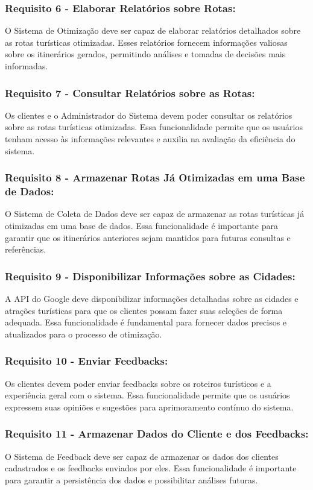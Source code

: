 \subsubsection{Requisito 6 - Elaborar Relatórios sobre Rotas:} O Sistema de Otimização deve ser capaz de elaborar relatórios detalhados sobre as rotas turísticas otimizadas. Esses relatórios fornecem informações valiosas sobre os itinerários gerados, permitindo análises e tomadas de decisões mais informadas.

\subsubsection{Requisito 7 - Consultar Relatórios sobre as Rotas:} Os clientes e o Administrador do Sistema devem poder consultar os relatórios sobre as rotas turísticas otimizadas. Essa funcionalidade permite que os usuários tenham acesso às informações relevantes e auxilia na avaliação da eficiência do sistema.

\subsubsection{Requisito 8 - Armazenar Rotas Já Otimizadas em uma Base de Dados:} O Sistema de Coleta de Dados deve ser capaz de armazenar as rotas turísticas já otimizadas em uma base de dados. Essa funcionalidade é importante para garantir que os itinerários anteriores sejam mantidos para futuras consultas e referências.

\subsubsection{Requisito 9 - Disponibilizar Informações sobre as Cidades:} A API do Google deve disponibilizar informações detalhadas sobre as cidades e atrações turísticas para que os clientes possam fazer suas seleções de forma adequada. Essa funcionalidade é fundamental para fornecer dados precisos e atualizados para o processo de otimização.

\subsubsection{Requisito 10 - Enviar Feedbacks:} Os clientes devem poder enviar feedbacks sobre os roteiros turísticos e a experiência geral com o sistema. Essa funcionalidade permite que os usuários expressem suas opiniões e sugestões para aprimoramento contínuo do sistema.

\subsubsection{Requisito 11 - Armazenar Dados do Cliente e dos Feedbacks:} O Sistema de Feedback deve ser capaz de armazenar os dados dos clientes cadastrados e os feedbacks enviados por eles. Essa funcionalidade é importante para garantir a persistência dos dados e possibilitar análises futuras.

